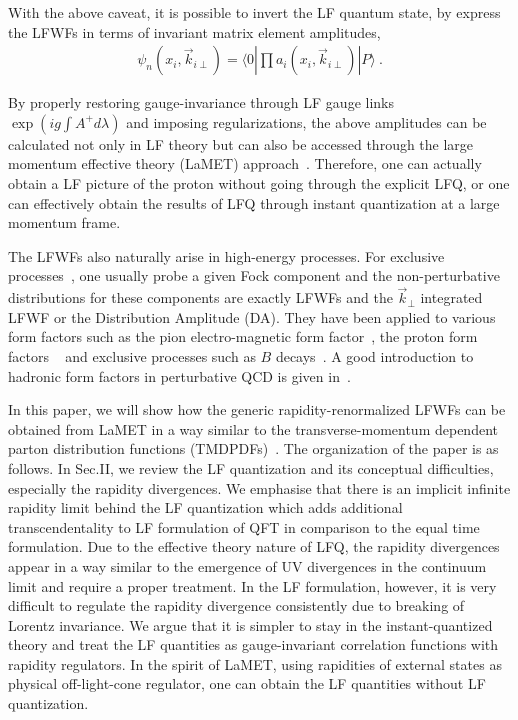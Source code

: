 \documentclass[twocolumn,superscriptaddress,longbibliography,10pt]{revtex4-1}
\begin{document}
With the above caveat, it is possible to invert the LF quantum state, by
express the LFWFs in terms of invariant matrix element amplitudes,
\begin{align}\label{eq:LFcorre}
\psi_n(x_i,\vec{k}_{i\perp})=\langle 0|\prod a_i(x_i,\vec{k}_{i\perp})|P\rangle \ .
\end{align}

By properly restoring gauge-invariance through LF gauge links $\exp(ig\int A^+d\lambda)$ and imposing regularizations, the above
amplitudes can be calculated not only in LF theory but can also be accessed through the large momentum effective theory (LaMET)
approach~\cite{Ji:2013dva,Ji:2014gla,Cichy:2018mum,Ji:2020ect}. Therefore, one can actually obtain a LF picture of the proton without going through the explicit LFQ, or one can effectively obtain the results of
LFQ through instant quantization at a large momentum frame.

The LFWFs also naturally arise in high-energy processes.  For exclusive processes~\cite{Lepage:1979zb,Lepage:1980fj}, one usually probe a given Fock component and the non-perturbative distributions for these components are exactly LFWFs and the $\vec{k}_\perp$ integrated
LFWF or the Distribution Amplitude (DA). They have been applied to various form
factors such as the pion electro-magnetic form factor~\cite{Li:1992nu,Efremov:1979qk}, the proton form factors ~\cite{Aznaurian:1979zz,Li:1992ce,Duncan:1979hi,Lepage:1979za} and exclusive processes such as $B$ decays~\cite{Lepage:1979zb,Lepage:1980fj,Li:1994iu,Li:2012nk}. A good introduction to hadronic form factors in perturbative QCD is given in~\cite{Sterman:1997sx}.

In this paper, we will show how the generic rapidity-renormalized LFWFs can be
obtained from LaMET in a way similar to the transverse-momentum dependent parton distribution functions (TMDPDFs)~\cite{Ji:2019sxk}. The organization of the paper is as follows.  In Sec.II, we review the LF quantization and its conceptual difficulties, especially the rapidity divergences. We emphasise that there is an implicit infinite rapidity limit behind the LF quantization which adds additional transcendentality to LF formulation of QFT in comparison to the equal time formulation.  Due to the effective theory nature of LFQ, the rapidity divergences appear in a way similar to the emergence of UV divergences in the continuum limit and require a proper treatment. In the LF formulation, however, it is very difficult to regulate the rapidity divergence consistently due to breaking of Lorentz invariance. We argue that it is simpler to stay in the instant-quantized theory and treat the LF quantities as gauge-invariant correlation functions with rapidity regulators. In the spirit of LaMET, using rapidities of external states as physical off-light-cone regulator, one can obtain the LF quantities without LF quantization.
\end{document}
